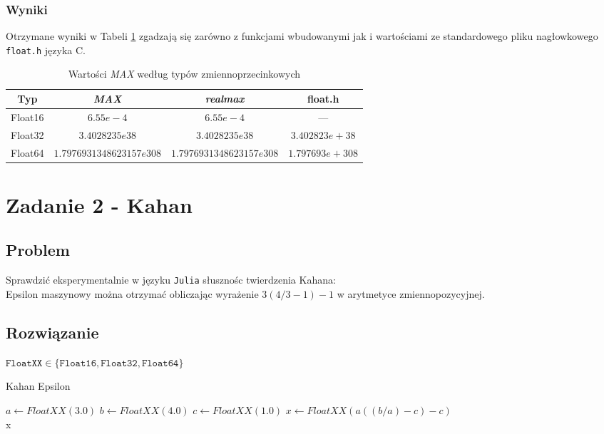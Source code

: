 \documentclass{article}
\begin{document}
    \subsubsection{Wyniki}
    Otrzymane wyniki w Tabeli \ref{table:MAX} zgadzają się zarówno z funkcjami wbudowanymi jak i wartościami ze standardowego pliku nagłowkowego \texttt{float.h} języka C.
    {\small
        \begin{table}[h!]
        \centering
        \begin{tabular}{c c c c}
            \hline
             Typ & \textit{MAX} & \textit{realmax} & float.h \\
             \hline
             Float16 & $6.55e-4$ & $6.55e-4$ & --- \\
             Float32 & $3.4028235e38$ & $3.4028235e38$ & $3.402823e+38$ \\
             Float64 & $1.7976931348623157e308$ & $1.7976931348623157e308$ & $1.797693e+308$\\
             \hline
        \end{tabular}
        \caption{Wartości \textit{MAX} według typów zmiennoprzecinkowych}
        \label{table:MAX}
        \end{table}
        }
    \section{Zadanie 2 - Kahan}
    \subsection{Problem}
    Sprawdzić eksperymentalnie w języku \texttt{Julia} słusznośc twierdzenia Kahana: \\
    Epsilon maszynowy można otrzymać obliczając wyrażenie $3(4/3-1)-1$ w arytmetyce zmiennopozycyjnej.
    \subsection{Rozwiązanie}
        $\texttt{FloatXX} \in \{\texttt{Float16}, \texttt{Float32}, \texttt{Float64}\}$
        \begin{algorithm}
            \caption{Kahan Epsilon}
            \begin{algorithmic}[1]
            \State $a\gets FloatXX(3.0)$
            \State $b\gets FloatXX(4.0)$
            \State $c\gets FloatXX(1.0)$
            \State $x\gets FloatXX(a((b/a)-c)-c)$ \\
            \Return x
            \end{algorithmic}
        \end{algorithm}
\end{document}
